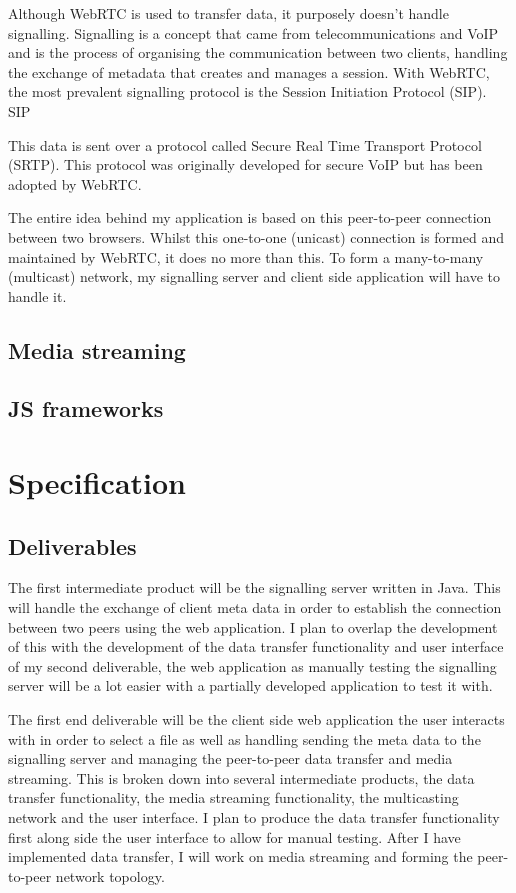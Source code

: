 \documentclass[]{report}
\begin{document}
			Although WebRTC is used to transfer data, it purposely doesn't handle signalling. Signalling is a concept that came from telecommunications and VoIP and is the process of organising the communication between two clients, handling the exchange of metadata that creates and manages a session. With WebRTC, the most prevalent signalling protocol is the Session Initiation Protocol (SIP). SIP 
				
			This data is sent over a protocol called Secure Real Time Transport Protocol (SRTP). This protocol was originally developed for secure VoIP but has been adopted by WebRTC. 
			
			The entire idea behind my application is based on this peer-to-peer connection between two browsers. Whilst this one-to-one (unicast) connection is formed and maintained by WebRTC, it does no more than this. To form a many-to-many (multicast) network, my signalling server and client side application will have to handle it.
		
		\subsection*{Media streaming}
		\subsection*{JS frameworks}
			
	\section{Specification}
			\subsection*{Deliverables}
			The first intermediate product will be the signalling server written in Java. This will handle the exchange of client meta data in order to establish the connection between two peers using the web application. I plan to overlap the development of this with the development of the data transfer functionality and user interface of my second deliverable, the web application as manually testing the signalling server will be a lot easier with a partially developed application to test it with.
			
			The first end deliverable will be the client side web application the user interacts with in order to select a file as 	well as handling sending the meta data to the signalling server and managing the peer-to-peer data transfer and media streaming. This is broken down into several intermediate products, the data transfer functionality, the media streaming functionality, the multicasting network and the user interface. I plan to produce the data transfer functionality first along side the user interface to allow for manual testing. After I have implemented data transfer, I will work on media streaming and forming the peer-to-peer network topology. 
			
\end{document}
